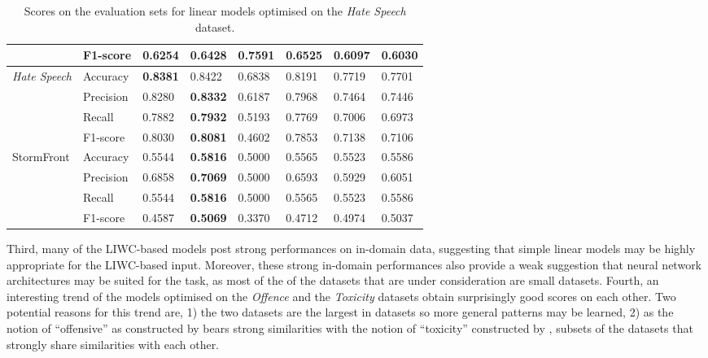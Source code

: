 \begin{table}[]
\begin{minipage}{0.42\paperheight}
{\begin{tabular}{ll|ll|ll|ll}
                                           & F1-score  & 0.6254       & 0.6428           & \bf{0.7591} & 0.6525        & 0.6097      & 0.6030      \\ \hline
    \multirow{4}{*}{\textit{Hate Speech}}  & Accuracy  & \bf{0.8381}  & 0.8422           & 0.6838      & 0.8191        & 0.7719      & 0.7701      \\
                                           & Precision & 0.8280       & \bf{0.8332}      & 0.6187      & 0.7968        & 0.7464      & 0.7446      \\
                                           & Recall    & 0.7882       & \bf{0.7932}      & 0.5193      & 0.7769        & 0.7006      & 0.6973      \\
                                           & F1-score  & 0.8030       & \bf{0.8081}      & 0.4602      & 0.7853        & 0.7138      & 0.7106      \\ \hline
    \multirow{4}{*}{StormFront}            & Accuracy  & 0.5544       & \bf{0.5816}      & 0.5000      & 0.5565        & 0.5523      & 0.5586      \\
                                           & Precision & 0.6858       & \bf{0.7069}      & 0.5000      & 0.6593        & 0.5929      & 0.6051      \\
                                           & Recall    & 0.5544       & \bf{0.5816}      & 0.5000      & 0.5565        & 0.5523      & 0.5586      \\
                                           & F1-score  & 0.4587       & \bf{0.5069}      & 0.3370      & 0.4712        & 0.4974      & 0.5037
    \end{tabular}%
    }
    \caption{Scores on the evaluation sets for linear models optimised on the \textit{Hate Speech} dataset.}
    \label{tab:linear_hatespeech_baselines}
\end{minipage}
\end{table}

Third, many of the LIWC-based models post strong performances on in-domain data, suggesting that simple linear models may be highly appropriate for the LIWC-based input.
Moreover, these strong in-domain performances also provide a weak suggestion that neural network architectures may be  suited for the task, as most of the of the datasets that are under consideration are small datasets.
Fourth, an interesting trend of the models optimised on the \textit{Offence} and the \textit{Toxicity} datasets obtain surprisingly good scores on each other.
Two potential reasons for this trend are, 1) the two datasets are the largest in datasets so more general patterns may be learned, 2) as the notion of ``offensive'' as constructed by \citet{Davidson:2017} bears strong similarities with the notion of ``toxicity'' constructed by \citet{Wulczyn:2017},  subsets of the datasets that strongly share similarities with each other.

